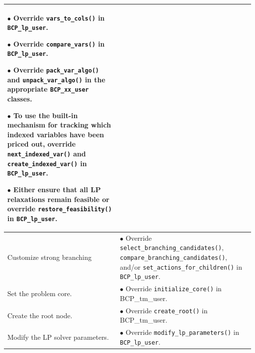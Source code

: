 {\begin{longtable}{|p{2in}|p{3.65in}|}
\begin{minipage}[t]{3.65in}
$\bullet$ Override {\tt vars\_to\_cols()} in {\tt BCP\_lp\_user}.

$\bullet$ Override {\tt compare\_vars()} in {\tt BCP\_lp\_user}.

$\bullet$ Override {\tt pack\_var\_algo()} and {\tt unpack\_var\_algo()} 
in the appropriate {\tt BCP\_xx\_user} classes.

$\bullet$ To use the built-in mechanism for tracking which indexed
variables have been priced out, override {\tt next\_indexed\_var()}
and {\tt create\_indexed\_var()} in {\tt BCP\_lp\_user}.

$\bullet$ Either ensure that all LP relaxations remain feasible or
override {\tt restore\_feasibility()} in {\tt BCP\_lp\_user}.

\end{minipage}\\

\hline

Customize strong branching & 

\begin{minipage}[t]{3.65in}

$\bullet$ Override {\tt select\_branching\_candidates()}, 
{\tt compare\_branching\_candidates()}, 
and/or {\tt set\_actions\_for\_children()} in {\tt BCP\_lp\_user}.

\end{minipage}\\

\hline

Set the problem core. & 

\begin{minipage}[t]{3.65in}
$\bullet$ Override {\tt initialize\_core()} in {BCP\_tm\_user}.
\end{minipage}\\

\hline

Create the root node. & 

\begin{minipage}[t]{3.65in}

$\bullet$ Override {\tt create\_root()} in {BCP\_tm\_user}.

\end{minipage}\\

\hline

Modify the LP solver parameters. & 

\begin{minipage}[t]{3.65in}

$\bullet$ Override {\tt modify\_lp\_parameters()} in {\tt BCP\_lp\_user}.


\end{minipage}
\end{longtable}}
